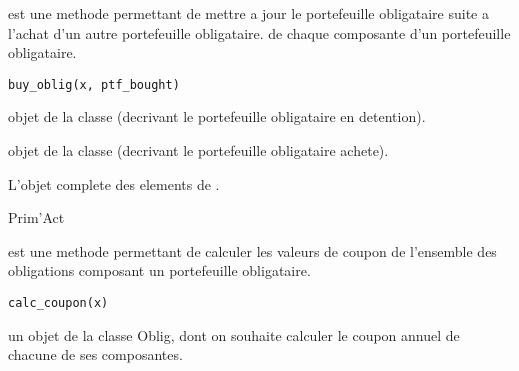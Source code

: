 \documentclass[a4paper]{book}
\begin{document}
%
\begin{Description}\relax
{} est une methode permettant de mettre a jour le portefeuille obligataire suite a l'achat d'un autre portefeuille obligataire.
de chaque composante d'un portefeuille obligataire.
\end{Description}
%
\begin{Usage}
\begin{verbatim}
buy_oblig(x, ptf_bought)
\end{verbatim}
\end{Usage}
%
\begin{Arguments}
\begin{ldescription}
\item[\code{x}] objet de la classe  (decrivant le portefeuille obligataire en detention).

\item[\code{ptf\_bought}] objet de la classe  (decrivant le portefeuille obligataire achete).
\end{ldescription}
\end{Arguments}
%
\begin{Value}
L'objet  complete des elements de .
\end{Value}
%
\begin{Author}\relax
Prim'Act
\end{Author}
%
\begin{Description}\relax
{} est une methode permettant de calculer les valeurs de coupon de l'ensemble des obligations
composant un portefeuille obligataire.
\end{Description}
%
\begin{Usage}
\begin{verbatim}
calc_coupon(x)
\end{verbatim}
\end{Usage}
%
\begin{Arguments}
\begin{ldescription}
\item[\code{x}] un objet de la classe Oblig, dont on souhaite calculer le coupon annuel de chacune de ses composantes.
\end{ldescription}
\end{Arguments}
\end{document}

